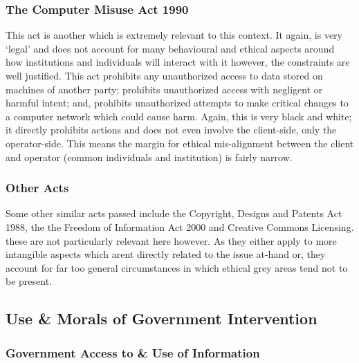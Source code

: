 \documentclass[11pt, english]{article}
\begin{document}
		\subsubsection{The Computer Misuse Act 1990}

	This act is another which is extremely relevant to this context. It again, is very `legal' and does not account for many behavioural and ethical aspects around how institutions and individuals will interact with it however, the constraints are well justified. This act prohibits any unauthorized access to data stored on machines of another party; prohibits unauthorized access with negligent or harmful intent; and, prohibits unauthorized attempts to make critical changes to a computer network which could cause harm. Again, this is very black and white; it directly prohibits actions and does not even involve the client-side, only the operator-side. This means the margin for ethical mis-alignment between the client and operator (common individuals and institution) is fairly narrow. 

		\subsubsection{Other Acts}

	Some other similar acts passed include the Copyright, Designs and Patents Act 1988, the the Freedom of Information Act 2000 and Creative Commons Licensing. these are not particularly relevant here however. As they either apply to more intangible aspects which arent directly related to the issue at-hand or, they account for far too general circumstances in which ethical grey areas tend not to be present.

	\subsection{Use \& Morals of Government Intervention}

		\subsubsection{Government Access to \& Use of Information}
\end{document}
